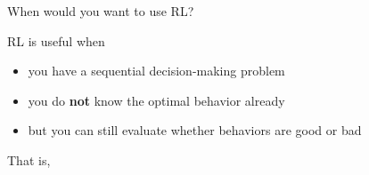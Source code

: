 \documentclass[9pt]{beamer}
\begin{document}
\begin{frame}{When would you want to use RL?}

RL is useful when
%
\begin{itemize}
\item you have a sequential decision-making problem
\item you do \textbf{not} know the optimal behavior already\footnotemark[1]
\item but you can still evaluate whether behaviors are good or bad
\end{itemize}

\vspace{3em}

That is, 

\begin{center}
\end{center}


\end{frame}
\end{document}
